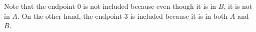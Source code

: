 \documentclass[letterpaper,12pt,fleqn]{article}
\begin{document}
\begin{enumerate}
\begin{enumerate}

  Note that the endpoint $0$ is not included because even though it is in $B$,
  it is not in $A$. On the other hand, the endpoint $3$ is included because it
  is in both $A$ and $B$.
\end{enumerate}
\end{enumerate}
\end{document}
